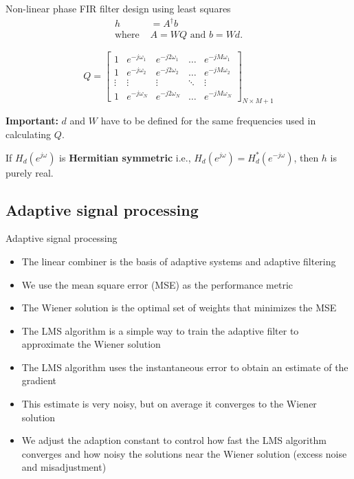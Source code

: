 \documentclass[10pt, aspectratio=169]{beamer}
\begin{document}
%
\begin{frame}{Non-linear phase FIR filter design using least squares}
\begin{align*}
h &= A^{\dagger}b \tag{least-squares solution} \\
\text{where } & A = WQ \text{ and } b = Wd. 
\end{align*}

\begin{equation*}
Q = \begin{bmatrix}
1 & e^{-j\omega_1} & e^{-j2\omega_1} & \ldots & e^{-jM\omega_1} \\
1 & e^{-j\omega_2} & e^{-j2\omega_2} & \ldots & e^{-jM\omega_2} \\
\vdots & \vdots &  \vdots & \ddots & \vdots \\
1 & e^{-j\omega_N} & e^{-j2\omega_N} & \ldots & e^{-jM\omega_N}
\end{bmatrix}_{N\times M+1}
\end{equation*}

\textbf{Important:} $d$ and $W$ have to be defined for the same frequencies used in calculating $Q$.

If $H_d(e^{j\omega})$ is \textbf{Hermitian symmetric} i.e., $H_d(e^{j\omega}) = H_d^*(e^{-j\omega})$, then $h$ is purely real.
\end{frame}

\subsection{Adaptive signal processing}
\begin{frame}{Adaptive signal processing}
\begin{itemize}
	\item The linear combiner is the basis of adaptive systems and adaptive filtering
	\item We use the mean square error (MSE) as the performance metric
	\item The Wiener solution is the optimal set of weights that minimizes the MSE
	\item The LMS algorithm is a simple way to train the adaptive filter to approximate the Wiener solution
	\item The LMS algorithm uses the instantaneous error to obtain an estimate of the gradient
	\item This estimate is very noisy, but on average it converges to the Wiener solution
	\item We adjust the adaption constant to control how fast the LMS algorithm converges and how noisy the solutions near the Wiener solution (excess noise and misadjustment)
\end{itemize}
\end{frame}
\end{document}
